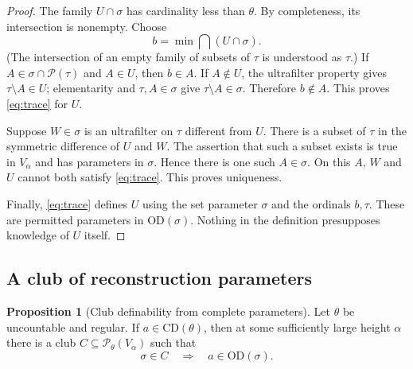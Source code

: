 \documentclass[11pt,letterpaper]{article}
\theoremstyle{definition}
\newtheorem{proposition}[definition]{Proposition}
\newcommand{\OD}{\mathrm{OD}}
\newcommand{\CD}{\mathrm{CD}}
\newcommand{\Pow}{\mathcal{P}}
\begin{document}
\begin{proof}
The family $U\cap\sigma$ has cardinality less than $\theta$. By completeness, its intersection is nonempty. Choose
\[
             b=\min\bigcap(U\cap\sigma).
\]
(The intersection of an empty family of subsets of $\tau$ is understood as $\tau$.) If $A\in\sigma\cap\Pow(\tau)$ and $A\in U$, then $b\in A$. If $A\notin U$, the ultrafilter property gives $\tau\setminus A\in U$; elementarity and $\tau,A\in\sigma$ give $\tau\setminus A\in\sigma$. Therefore $b\notin A$. This proves \eqref{eq:trace} for $U$.

Suppose $W\in\sigma$ is an ultrafilter on $\tau$ different from $U$. There is a subset of $\tau$ in the symmetric difference of $U$ and $W$. The assertion that such a subset exists is true in $V_\alpha$ and has parameters in $\sigma$. Hence there is one such $A\in\sigma$. On this $A$, $W$ and $U$ cannot both satisfy \eqref{eq:trace}. This proves uniqueness.

Finally, \eqref{eq:trace} defines $U$ using the set parameter $\sigma$ and the ordinals $b,\tau$. These are permitted parameters in $\OD(\sigma)$. Nothing in the definition presupposes knowledge of $U$ itself.
\end{proof}

\subsection{A club of reconstruction parameters}

\begin{proposition}[Club definability from complete parameters]\label{prop:club}
Let $\theta$ be uncountable and regular. If $a\in\CD(\theta)$, then at some sufficiently large height $\alpha$ there is a club $C\subseteq\Pow_\theta(V_\alpha)$ such that
\begin{equation}\label{eq:clubdef}
                 \sigma\in C\quad\Longrightarrow\quad a\in\OD(\sigma).
\end{equation}
\end{proposition}
\end{document}
